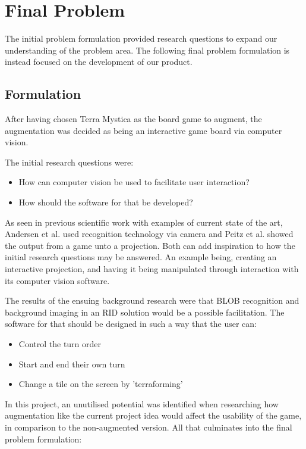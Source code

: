 \chapter{Final Problem}\label{ch:finprob}
The initial problem formulation provided research questions to expand our understanding of the problem area. The following final problem formulation is instead focused on the development of our product.

\section{Formulation}
After having chosen Terra Mystica as the board game to augment, the augmentation was decided as being an interactive game board via computer vision.

The initial research questions were:
\begin{itemize}
	\item How can computer vision be used to facilitate user interaction?
	\item How should the software for that be developed?
\end{itemize}

As seen in previous scientific work with examples of current state of the art, Andersen et al. \citep{andersen_designing_2004} used recognition technology via camera and Peitz et al. \citep{peitzWizards2006} showed the output from a game unto a projection. Both can add inspiration to how the initial research questions may be answered. An example being, creating an interactive projection, and having it being manipulated through interaction with its computer vision software.

The results of the ensuing background research were that BLOB recognition and background imaging in an RID solution would be a possible facilitation.
The software for that should be designed in such a way that the user can:
\begin{itemize}
\item Control the turn order
\item Start and end their own turn
\item Change a tile on the screen by 'terraforming'
\end{itemize}

In this project, an unutilised potential was identified when researching how augmentation like the current project idea would affect the usability of the game, in comparison to the non-augmented version. All that culminates into the final problem formulation:


